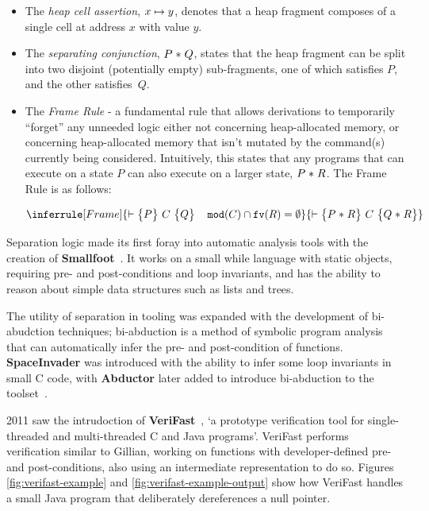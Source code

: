 \begin{itemize}
  \item The \textit{heap cell assertion}, $x \mapsto y$, denotes that a heap
  fragment composes of a single cell at address $x$ with value $y$.

  \item The \textit{separating conjunction}, $P \mathrel{*} Q$, states that the heap
  fragment can be split into two disjoint (potentially empty) sub-fragments,
  one of which satisfies $P$, and the other satisfies~$Q$.

  \item The \textit{Frame Rule} - a fundamental rule that allows derivations to
  temporarily ``forget'' any unneeded logic either not concerning
  heap-allocated memory, or concerning heap-allocated memory that isn't mutated
  by the command(s) currently being considered. Intuitively, this states that
  any programs that can execute on a state $P$ can also execute on a larger
  state, $P \mathrel{*} R$. The Frame Rule is as follows:

  $$
    \inferrule[Frame]{
      \triple{P}{C}{Q} \quad \mathtt{mod}(C) \cap \mathtt{fv}(R) =
      \emptyset}{\triple{P \lstar R}{C}{Q \lstar R}
    }
  $$
\end{itemize}


Separation logic made its first foray into automatic analysis tools with the
creation of \textbf{Smallfoot}~\cite{smallfoot-paper, smallfoot-site}. It works
on a small while language with static objects, requiring pre- and
post-conditions and loop invariants, and has the ability to reason about simple
data structures such as lists and trees.

The utility of separation in tooling was expanded with the development of
bi-abudction techniques; bi-abduction is a method of symbolic program analysis
that can automatically infer the pre- and post-condition of functions.
\textbf{SpaceInvader} was introduced with the ability to infer some loop
invariants in small C code, with \textbf{Abductor} later added to introduce
bi-abduction to the toolset~\cite{abductor}.

2011 saw the intrudoction of \textbf{VeriFast}~\cite{verifast-paper,
  verifast-repo}, `a prototype verification tool for single-threaded and
multi-threaded C and Java programs'. VeriFast performs verification similar to
Gillian, working on functions with developer-defined pre- and post-conditions,
also using an intermediate representation to do so. Figures
\autoref{fig:verifast-example} and \autoref{fig:verifast-example-output} show how
VeriFast handles a small Java program that deliberately dereferences a null
pointer.

